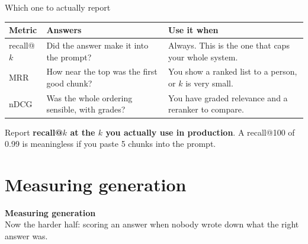 \documentclass[aspectratio=169]{beamer}
\newcommand{\takebox}[1]{%
  \begin{tcolorbox}[colback=paramgreen!8, colframe=paramgreen, boxrule=0.6pt, arc=2pt]
  #1
  \end{tcolorbox}}
\newcommand{\sectiontransition}[2]{%
  \begin{frame}[plain]
    \vfill
    \begin{center}
      {\Huge\bfseries\color{popblue} #1}\\[1.1em]
      {\large #2}
    \end{center}
    \vfill
  \end{frame}}
\begin{document}
\begin{frame}{Which one to actually report}
  \vspace{0.8em}
  \begin{center}
  \small
  \begin{tabular}{p{}p{}p{}}
    \toprule
    \textbf{Metric} & \textbf{Answers} & \textbf{Use it when} \\
    \midrule
    recall@$k$ & Did the answer make it into the prompt? & Always. This is the one that
    caps your whole system. \\[0.4em]
    MRR & How near the top was the first good chunk? & You show a ranked list to a person,
    or $k$ is very small. \\[0.4em]
    nDCG & Was the whole ordering sensible, with grades? & You have graded relevance and
    a reranker to compare. \\
    \bottomrule
  \end{tabular}
  \end{center}

  \vspace{1.0em}
  \takebox{Report \textbf{recall@$k$ at the $k$ you actually use in production}. A recall@100
  of 0.99 is meaningless if you paste 5 chunks into the prompt.}
\end{frame}

\section{Measuring generation}
\sectiontransition{Measuring generation}{Now the harder half: scoring an answer when nobody
wrote down what the right answer was.}
\end{document}
